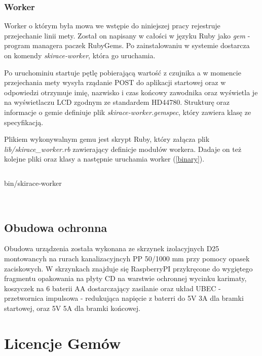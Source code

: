 \documentclass[11pt,a4paper, twoside]{article}
\begin{document}
\subsubsection{Worker}
Worker o którym była mowa we wstępie do niniejszej pracy rejestruje przejechanie linii mety. Został on napisany w całości w języku Ruby jako \emph{gem} - program managera paczek RubyGems. Po zainstalowaniu w systemie dostarcza on komendy \emph{skirace-worker}, która go uruchamia.


Po uruchominiu startuje pętlę pobierającą wartość z czujnika a w momencie przejechania mety wysyła rządanie POST do aplikacji startowej oraz w odpowiedzi otrzymuje imię, nazwisko i czas końcowy zawodnika oraz wyświetla je na wyświetlaczu LCD zgodnym ze standardem HD44780. Strukturę oraz informacje o gemie definiuje plik \emph{skirace-worker.gemspec}, który zawiera klasę ze specyfikacją.

Plikiem wykonywalnym gemu jest skrypt Ruby, który załącza plik \emph{lib/skirace\_worker.rb} zawierający definicje modułów workera. Dadaje on też kolejne pliki oraz klasy a następnie uruchamia worker (\ref{binary}). 

\begin{listing}
\inputminted[linenos=true]{ruby}{./src/binary}
\caption{bin/skirace-worker}
$\label{binary}$
\end{listing}



\newpage
\subsection{Obudowa ochronna}
Obudowa urządzenia została wykonana ze skrzynek izolacyjnych D25 montowancyh na rurach kanalizacyjncyh PP 50/1000 mm przy pomocy opasek zaciskowych. W skrzynkach znajduje się RaspberryPI przykręcone do wygiętego fragmentu opakowania na płyty CD na warstwie ochronnej wycinku karimaty, koszyczek na 6 baterii AA dostarczający zasilanie oraz układ UBEC - przetwornica impulsowa - redukująca napięcie z baterri do 5V 3A dla bramki startowej, oraz 5V 5A dla bramki końcowej.
\newpage
\section{Licencje Gemów}
\end{document}
